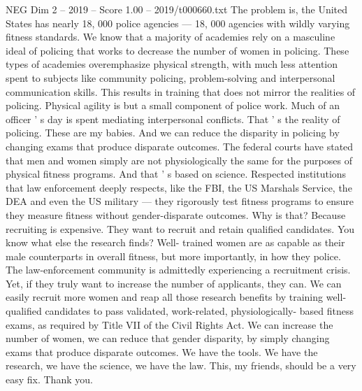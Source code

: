 \begin{textsample}{NEG Dim 2 – 2019 – Score 1.00 – 2019/t000660.txt}
The problem is, the United States has nearly 18, 000 police agencies — 18, 000 agencies with wildly varying fitness standards.
We know that a majority of academies rely on a masculine ideal of policing that works to decrease the number of women in policing.
These types of academies overemphasize physical strength, with much less attention spent to subjects like community policing, problem-solving and interpersonal communication skills.
This results in training that does not mirror the realities of policing.
Physical agility is but a small component of police work.
Much of an officer ' s day is spent mediating interpersonal conflicts.
That ' s the reality of policing.
These are my babies.
And we can reduce the disparity in policing by changing exams that produce disparate outcomes.
The federal courts have stated that men and women simply are not physiologically the same for the purposes of physical fitness programs.
And that ' s based on science.
Respected institutions that law enforcement deeply respects, like the FBI, the US Marshals Service, the DEA and even the US military — they rigorously test fitness programs to ensure they measure fitness without gender-disparate outcomes.
Why is that?
Because recruiting is expensive.
They want to recruit and retain qualified candidates.
You know what else the research finds?
Well- trained women are as capable as their male counterparts in overall fitness, but more importantly, in how they police.
The law-enforcement community is admittedly experiencing a recruitment crisis.
Yet, if they truly want to increase the number of applicants, they can.
We can easily recruit more women and reap all those research benefits by training well-qualified candidates to pass validated, work-related, physiologically- based fitness exams, as required by Title VII of the Civil Rights Act.
We can increase the number of women, we can reduce that gender disparity, by simply changing exams that produce disparate outcomes.
We have the tools.
We have the research, we have the science, we have the law.
This, my friends, should be a very easy fix.
Thank you.

\end{textsample}
